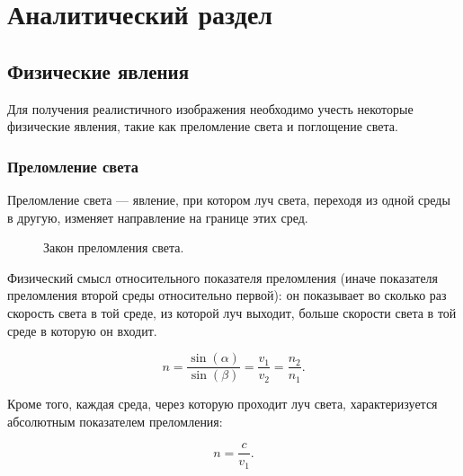 \documentclass[14pt,a4paper]{extarticle}
\begin{document}
\section{Аналитический раздел}
	\subsection{Физические явления}
		Для получения реалистичного изображения необходимо учесть некоторые физические явления,
		такие как преломление света и поглощение света.
		\subsubsection*{Преломление света}
			Преломление света --- явление, при котором луч света, переходя из одной среды в другую,
			изменяет направление на границе этих сред.
			
			\begin{figure}[H]%
				\noindent{}
				\caption{Закон преломления света.}
			\end{figure}
			
			Физический смысл относительного показателя преломления (иначе показателя преломления второй среды относительно первой):
			он показывает во сколько раз скорость света в той среде, из которой луч выходит, больше скорости света в той среде
			в которую он входит.
			
			\begin{equation*}
			n = \frac{\sin(\alpha)}{\sin(\beta)} = \frac{v_1}{v_2} = \frac{n_2}{n_1}.
			\end{equation*}
			
			Кроме того, каждая среда, через которую проходит луч света, характеризуется абсолютным показателем преломления:
			
			\begin{equation*}
			n = \frac{c}{v_1}.
			\end{equation*}
			
\end{document}
